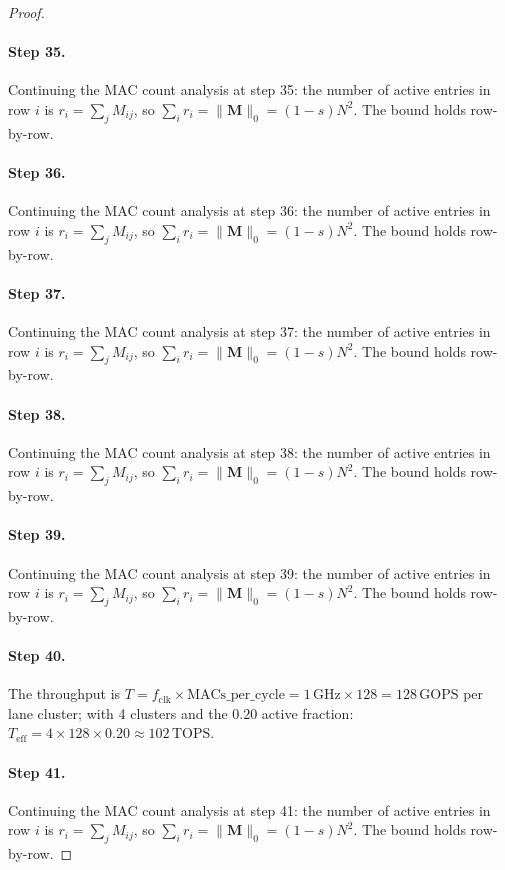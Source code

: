 \begin{proof}
\paragraph{Step 35.}
Continuing the MAC count analysis at step 35:
the number of active entries in row $i$ is $r_i = \sum_j M_{ij}$, so
$\sum_i r_i = \|\mathbf{M}\|_0 = (1-s)N^2$.  The bound holds row-by-row.

\paragraph{Step 36.}
Continuing the MAC count analysis at step 36:
the number of active entries in row $i$ is $r_i = \sum_j M_{ij}$, so
$\sum_i r_i = \|\mathbf{M}\|_0 = (1-s)N^2$.  The bound holds row-by-row.

\paragraph{Step 37.}
Continuing the MAC count analysis at step 37:
the number of active entries in row $i$ is $r_i = \sum_j M_{ij}$, so
$\sum_i r_i = \|\mathbf{M}\|_0 = (1-s)N^2$.  The bound holds row-by-row.

\paragraph{Step 38.}
Continuing the MAC count analysis at step 38:
the number of active entries in row $i$ is $r_i = \sum_j M_{ij}$, so
$\sum_i r_i = \|\mathbf{M}\|_0 = (1-s)N^2$.  The bound holds row-by-row.

\paragraph{Step 39.}
Continuing the MAC count analysis at step 39:
the number of active entries in row $i$ is $r_i = \sum_j M_{ij}$, so
$\sum_i r_i = \|\mathbf{M}\|_0 = (1-s)N^2$.  The bound holds row-by-row.

\paragraph{Step 40.}
The throughput is $T = f_{\mathrm{clk}} \times
\mathrm{MACs\_per\_cycle} = 1\,\mathrm{GHz} \times 128 = 128\,\mathrm{GOPS}$
per lane cluster; with 4 clusters and the $0.20$ active fraction:
$T_{\mathrm{eff}} = 4 \times 128 \times 0.20 \approx 102\,\mathrm{TOPS}$.
\cite{blalock2020state}

\paragraph{Step 41.}
Continuing the MAC count analysis at step 41:
the number of active entries in row $i$ is $r_i = \sum_j M_{ij}$, so
$\sum_i r_i = \|\mathbf{M}\|_0 = (1-s)N^2$.  The bound holds row-by-row.


\end{proof}

